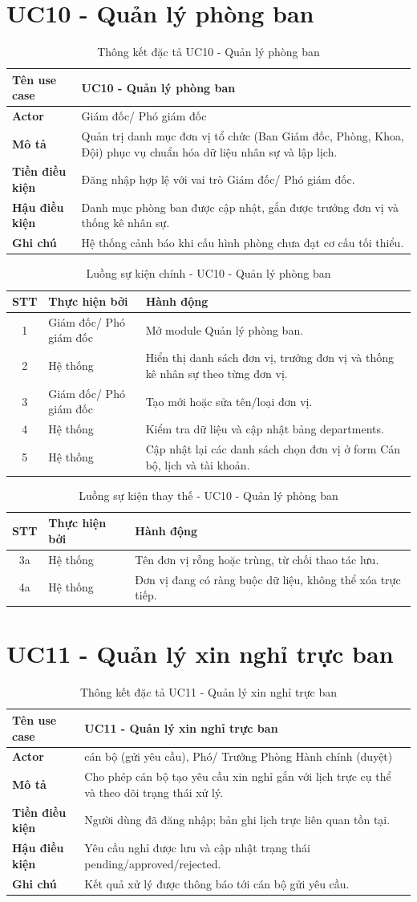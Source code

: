 \documentclass[18pt,a4paper]{report}
\newcommand{\specinfo}[6]{
\begin{table}[H]
\centering
\caption{Thông kết đặc tả #1}
\begin{tabularx}{\textwidth}{|>{\raggedright\arraybackslash}p{3.2cm}|X|}
\hline
\textbf{Tên use case} & #1 \\ \hline
\textbf{Actor} & #2 \\ \hline
\textbf{Mô tả} & #3 \\ \hline
\textbf{Tiền điều kiện} & #4 \\ \hline
\textbf{Hậu điều kiện} & #5 \\ \hline
\textbf{Ghi chú} & #6 \\ \hline
\end{tabularx}
\end{table}
}
\newcommand{\mainflowtable}[1]{
\begin{table}[H]
\centering
\caption{Luồng sự kiện chính - #1}
\begin{tabularx}{\textwidth}{|c|>{\raggedright\arraybackslash}p{3cm}|X|}
\hline
\textbf{STT} & \textbf{Thực hiện bởi} & \textbf{Hành động} \\ \hline
}
\newcommand{\altflowtable}[1]{
\begin{table}[H]
\centering
\caption{Luồng sự kiện thay thế - #1}
\begin{tabularx}{\textwidth}{|c|>{\raggedright\arraybackslash}p{3cm}|X|}
\hline
\textbf{STT} & \textbf{Thực hiện bởi} & \textbf{Hành động} \\ \hline
}
\begin{document}
\section{UC10 - Quản lý phòng ban}
\specinfo
{UC10 - Quản lý phòng ban}
{Giám đốc/ Phó giám đốc}
{Quản trị danh mục đơn vị tổ chức (Ban Giám đốc, Phòng, Khoa, Đội) phục vụ chuẩn hóa dữ liệu nhân sự và lập lịch.}
{Đăng nhập hợp lệ với vai trò Giám đốc/ Phó giám đốc.}
{Danh mục phòng ban được cập nhật, gắn được trưởng đơn vị và thống kê nhân sự.}
{Hệ thống cảnh báo khi cấu hình phòng chưa đạt cơ cấu tối thiểu.}

\mainflowtable{UC10 - Quản lý phòng ban}
1 & Giám đốc/ Phó giám đốc & Mở module Quản lý phòng ban. \\ \hline
2 & Hệ thống & Hiển thị danh sách đơn vị, trưởng đơn vị và thống kê nhân sự theo từng đơn vị. \\ \hline
3 & Giám đốc/ Phó giám đốc & Tạo mới hoặc sửa tên/loại đơn vị. \\ \hline
4 & Hệ thống & Kiểm tra dữ liệu và cập nhật bảng departments. \\ \hline
5 & Hệ thống & Cập nhật lại các danh sách chọn đơn vị ở form Cán bộ, lịch và tài khoản. \\ \hline
\end{tabularx}
\end{table}

\altflowtable{UC10 - Quản lý phòng ban}
3a & Hệ thống & Tên đơn vị rỗng hoặc trùng, từ chối thao tác lưu. \\ \hline
4a & Hệ thống & Đơn vị đang có ràng buộc dữ liệu, không thể xóa trực tiếp. \\ \hline
\end{tabularx}
\end{table}

\section{UC11 - Quản lý xin nghỉ trực ban}
\specinfo
{UC11 - Quản lý xin nghỉ trực ban}
{cán bộ (gửi yêu cầu), Phó/ Trưởng Phòng Hành chính (duyệt)}
{Cho phép cán bộ tạo yêu cầu xin nghỉ gắn với lịch trực cụ thể và theo dõi trạng thái xử lý.}
{Người dùng đã đăng nhập; bản ghi lịch trực liên quan tồn tại.}
{Yêu cầu nghỉ được lưu và cập nhật trạng thái pending/approved/rejected.}
{Kết quả xử lý được thông báo tới cán bộ gửi yêu cầu.}
\end{document}
